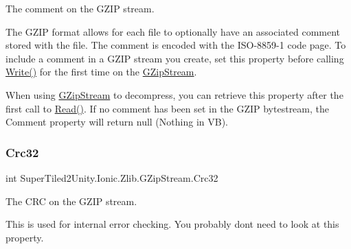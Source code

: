 The comment on the G\+Z\+IP stream. 

The G\+Z\+IP format allows for each file to optionally have an associated comment stored with the file. The comment is encoded with the I\+S\+O-\/8859-\/1 code page. To include a comment in a G\+Z\+IP stream you create, set this property before calling {\ttfamily \mbox{\hyperlink{class_super_tiled2_unity_1_1_ionic_1_1_zlib_1_1_g_zip_stream_a49032afb5806563236a5d53841abe2b8}{Write()}}} for the first time on the {\ttfamily \mbox{\hyperlink{class_super_tiled2_unity_1_1_ionic_1_1_zlib_1_1_g_zip_stream}{G\+Zip\+Stream}}}. 

When using {\ttfamily \mbox{\hyperlink{class_super_tiled2_unity_1_1_ionic_1_1_zlib_1_1_g_zip_stream}{G\+Zip\+Stream}}} to decompress, you can retrieve this property after the first call to {\ttfamily \mbox{\hyperlink{class_super_tiled2_unity_1_1_ionic_1_1_zlib_1_1_g_zip_stream_a772b5013a585850ffaf8be4aa7f3dbcf}{Read()}}}. If no comment has been set in the G\+Z\+IP bytestream, the Comment property will return {\ttfamily null} ({\ttfamily Nothing} in VB). \mbox{\label{class_super_tiled2_unity_1_1_ionic_1_1_zlib_1_1_g_zip_stream_a70e29334f61c43bc2c37591177f1869a}} 
\subsubsection{\texorpdfstring{Crc32}{Crc32}}
{\footnotesize\ttfamily int Super\+Tiled2\+Unity.\+Ionic.\+Zlib.\+G\+Zip\+Stream.\+Crc32\hspace{0.3cm}{\ttfamily [get]}}



The C\+RC on the G\+Z\+IP stream. 

This is used for internal error checking. You probably don\textquotesingle{}t need to look at this property. \mbox{\label{class_super_tiled2_unity_1_1_ionic_1_1_zlib_1_1_g_zip_stream_a9f84ab701414ec04ac9ef7107eb4a30c}} 

